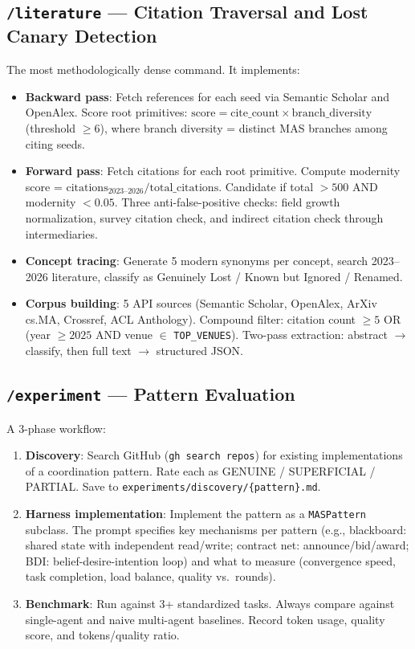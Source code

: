 \documentclass{article}
\begin{document}
\subsection{\texttt{/literature} --- Citation Traversal and Lost Canary Detection}

The most methodologically dense command. It implements:

\begin{itemize}[nosep]
  \item \textbf{Backward pass}: Fetch references for each seed via Semantic Scholar
    and OpenAlex. Score root primitives:
    $\text{score} = \text{cite\_count} \times \text{branch\_diversity}$ (threshold
    $\geq 6$), where branch diversity = distinct MAS branches among citing seeds.
  \item \textbf{Forward pass}: Fetch citations for each root primitive. Compute
    modernity score = $\text{citations}_{2023\text{--}2026} /
    \text{total\_citations}$. Candidate if total $> 500$ AND modernity $< 0.05$.
    Three anti-false-positive checks: field growth normalization, survey citation
    check, and indirect citation check through intermediaries.
  \item \textbf{Concept tracing}: Generate 5 modern synonyms per concept, search
    2023--2026 literature, classify as Genuinely Lost / Known but Ignored / Renamed.
  \item \textbf{Corpus building}: 5 API sources (Semantic Scholar, OpenAlex, ArXiv
    cs.MA, Crossref, ACL Anthology). Compound filter: citation count $\geq 5$ OR
    (year $\geq 2025$ AND venue $\in$ \texttt{TOP\_VENUES}). Two-pass extraction:
    abstract $\to$ classify, then full text $\to$ structured JSON.
\end{itemize}

\subsection{\texttt{/experiment} --- Pattern Evaluation}

A 3-phase workflow:

\begin{enumerate}[nosep]
  \item \textbf{Discovery}: Search GitHub (\texttt{gh search repos}) for existing
    implementations of a coordination pattern. Rate each as GENUINE / SUPERFICIAL /
    PARTIAL. Save to \texttt{experiments/discovery/\{pattern\}.md}.
  \item \textbf{Harness implementation}: Implement the pattern as a
    \texttt{MASPattern} subclass. The prompt specifies key mechanisms per pattern
    (e.g., blackboard: shared state with independent read/write; contract net:
    announce/bid/award; BDI: belief-desire-intention loop) and what to measure
    (convergence speed, task completion, load balance, quality vs.\ rounds).
  \item \textbf{Benchmark}: Run against 3+ standardized tasks. Always compare
    against single-agent and naive multi-agent baselines. Record token usage,
    quality score, and tokens/quality ratio.
\end{enumerate}
\end{document}
